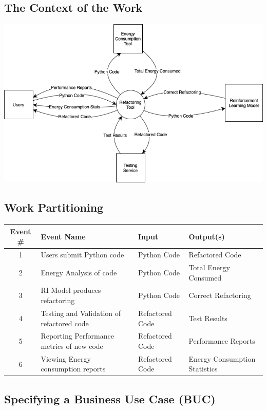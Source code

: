 \documentclass[12pt]{article}
\begin{document}
\subsection{The Context of the Work}

\includegraphics[scale=0.5]{../images/WorkContextModel.png}

\subsection{Work Partitioning}

\setlength\extrarowheight{5mm}
\begin{tabularx}{\textwidth}{|c|X|l|p{1.5in}|}
  \toprule \textbf{Event \#} & \textbf{Event Name} & \textbf{Input} & \textbf{Output(s)} \\
  \midrule
  1 & Users submit Python code & Python Code & Refactored Code \\
  2 & Energy Analysis of code & Python Code & Total Energy Consumed \\
  3 & RI Model produces refactoring & Python Code & Correct Refactoring \\
  4 & Testing and Validation of refactored code & Refactored Code & Test Results \\
  5 & Reporting Performance metrics of new code & Refactored Code & Performance Reports \\
  6 & Viewing Energy consumption reports & Refactored Code & Energy Consumption Statistics \\
  \bottomrule
\end{tabularx}

\subsection{Specifying a Business Use Case (BUC)}
\end{document}
